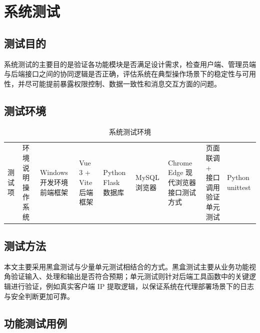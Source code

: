 \documentclass[12pt,a4paper]{ctexart}
\begin{document}
\clearpage
\section{系统测试}

\subsection{测试目的}
系统测试的主要目的是验证各功能模块是否满足设计需求，检查用户端、管理员端与后端接口之间的协同逻辑是否正确，评估系统在典型操作场景下的稳定性与可用性，并尽可能提前暴露权限控制、数据一致性和消息交互方面的问题。

\subsection{测试环境}
\begin{table}[H]
\centering
\caption{系统测试环境}
\begin{tabular}{p{4cm}p{8cm}}
\toprule
测试项 & 环境说明 
\midrule
操作系统 & Windows 开发环境 
前端框架 & Vue 3 + Vite 
后端框架 & Python Flask 
数据库 & MySQL 
浏览器 & Chrome  Edge 现代浏览器 
接口测试方式 & 页面联调 + 接口调用验证 
单元测试 & Python unittest 
\bottomrule
\end{tabular}
\label{tabtest-env}
\end{table}

\subsection{测试方法}
本文主要采用黑盒测试与少量单元测试相结合的方式。黑盒测试主要从业务功能视角验证输入、处理和输出是否符合预期；单元测试则针对后端工具函数中的关键逻辑进行验证，例如真实客户端 IP 提取逻辑，以保证系统在代理部署场景下的日志与安全判断更加可靠。

\subsection{功能测试用例}
\end{document}
